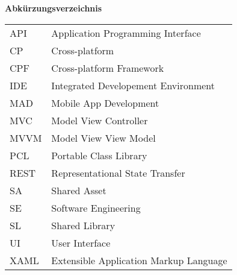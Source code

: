 %
%
% 
% 

\begin{center}
{\Large\bfseries Abkürzungsverzeichnis}
\end{center}

\begin{table*}[htbp]
		\begin{tabular}{ll}
			API &	Application Programming Interface\\
			CP  &	Cross-platform \\
			CPF &	Cross-platform Framework \\
			IDE	&	Integrated Developement Environment\\
			MAD &	Mobile App Development \\
			MVC &	Model View Controller\\
			MVVM&	Model View View Model\\
			PCL	&	Portable Class Library\\
			REST&	Representational State Transfer\\
			SA 	&	Shared Asset\\
			SE	&	Software Engineering\\
			SL	&	Shared Library\\
			UI	&	User Interface\\
			XAML&	Extensible Application Markup Language\\
		\end{tabular}
\end{table*}